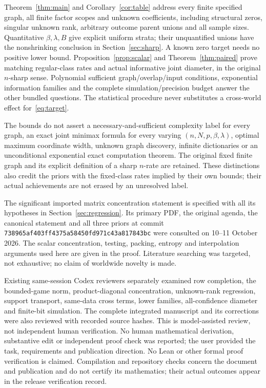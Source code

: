 \documentclass[11pt,a4paper]{article}
\numberwithin{equation}{section}
\theoremstyle{definition}
\begin{document}
Theorem~\ref{thm:main} and Corollary~\ref{cor:table} address every finite
specified graph, all finite factor scopes and unknown coefficients,
including structural zeros, singular unknown rank, arbitrary outcome
parent unions and all sample sizes. Quantitative $\beta,\lambda,B$
give explicit uniform strata; their unquantified unions have the
nonshrinking conclusion in Section~\ref{sec:sharp}. A known zero target
needs no positive lower bound. Proposition~\ref{prop:scalar} and
Theorem~\ref{thm:paired} prove matching regular-class rates and actual
informative joint diameter, in the original $n$-sharp sense. Polynomial
sufficient graph/overlap/input conditions, exponential information
families and the complete simulation/precision budget answer the other
bundled questions. The statistical procedure never substitutes a
cross-world effect for~\eqref{eq:target}.

The bounds do not assert a necessary-and-sufficient complexity label for
every graph, an exact joint minimax formula for every varying
$(n,N,p,\beta,\lambda)$, optimal maximum coordinate width, unknown graph
discovery, infinite dictionaries or an unconditional exponential exact
computation theorem. The original fixed finite graph and its explicit
definition of a sharp $n$-rate are retained. These distinctions also
credit the priors with the fixed-class rates implied by their own
bounds; their actual achievements are not erased by an unresolved label.

The significant imported matrix concentration statement is specified
with all its hypotheses in Section~\ref{sec:regression}. Its primary
PDF, the original agenda, the canonical statement and all three priors
at commit \texttt{738965af403ff4375a58450fd971c43a817843bc} were
consulted on 10--11 October 2026. The scalar concentration, testing,
packing, entropy and interpolation arguments used here are given in
the proof. Literature searching was targeted, not exhaustive; no claim
of worldwide novelty is made.

Existing same-session Codex reviewers separately examined row completion,
the bounded-game norm, product-diagonal concentration, unknown-rank
regression, support transport, same-data cross terms, lower families,
all-confidence diameter and finite-bit simulation. The complete integrated manuscript and its corrections were also
reviewed with recorded source hashes. This is model-assisted review,
not independent human verification. No human mathematical derivation,
substantive edit or independent proof check was reported; the user
provided the task, requirements and publication direction. No Lean or
other formal proof verification is claimed. Compilation and repository
checks concern the document and publication and do not certify its
mathematics; their actual outcomes appear in the release verification record.
\end{document}
